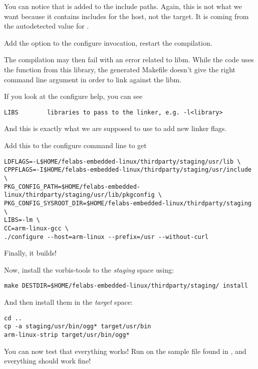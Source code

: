 You can notice that  is added to the include paths.
Again, this is not what we want because it contains includes for the
host, not the target. It is coming from the autodetected value for
.

Add the  option to the configure invocation,
restart the compilation.

The compilation may then fail with an error related to libm. While
the code uses the function from this library, the generated Makefile
doesn't give the right command line argument in order to link against
the libm.

If you look at the configure help, you can see
\begin{verbatim}
LIBS        libraries to pass to the linker, e.g. -l<library>
\end{verbatim}

And this is exactly what we are supposed to use to add new linker
flags.

Add this to the configure command line to get
\begin{verbatim}
LDFLAGS=-L$HOME/felabs-embedded-linux/thirdparty/staging/usr/lib \
CPPFLAGS=-I$HOME/felabs-embedded-linux/thirdparty/staging/usr/include \
PKG_CONFIG_PATH=$HOME/felabs-embedded-linux/thirdparty/staging/usr/lib/pkgconfig \
PKG_CONFIG_SYSROOT_DIR=$HOME/felabs-embedded-linux/thirdparty/staging \
LIBS=-lm \
CC=arm-linux-gcc \
./configure --host=arm-linux --prefix=/usr --without-curl
\end{verbatim}

Finally, it builds!

Now, install the vorbis-tools to the {\em staging} space using:

\begin{verbatim}
make DESTDIR=$HOME/felabs-embedded-linux/thirdparty/staging/ install
\end{verbatim}

And then install them in the {\em target} space:

\begin{verbatim}
cd ..
cp -a staging/usr/bin/ogg* target/usr/bin
arm-linux-strip target/usr/bin/ogg*
\end{verbatim}

You can now test that everything works! Run  on the
sample file found in , and everything should
work fine!
